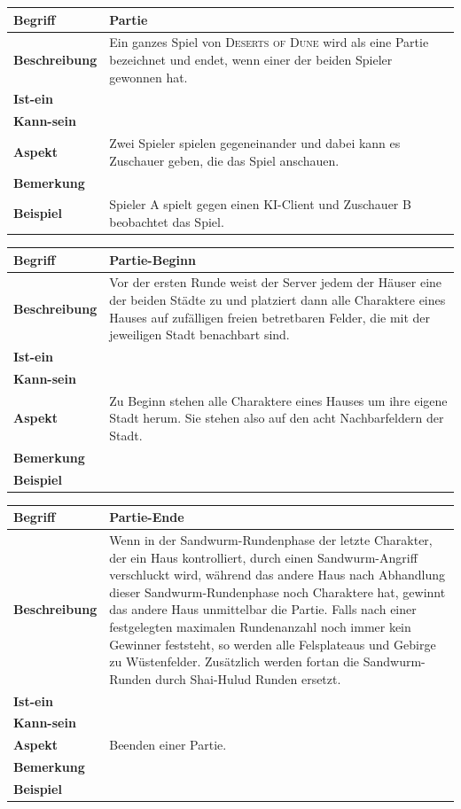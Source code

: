 \documentclass[12pt]{article}
\begin{document}
\begin{tabularx}{\linewidth}{|l|X|}
\hline
\textbf{Begriff} & \textbf{Partie} \\
\hline
\textbf{Beschreibung} & Ein ganzes Spiel von \textsc{Deserts of Dune} wird als eine Partie bezeichnet und endet, wenn einer der beiden Spieler gewonnen hat. \\
\hline
\textbf{Ist-ein} & \\
\hline
\textbf{Kann-sein} & \\
\hline
\textbf{Aspekt} & Zwei Spieler spielen gegeneinander und dabei kann es Zuschauer geben, die das Spiel anschauen.\\
\hline
\textbf{Bemerkung} &  \\
\hline
\textbf{Beispiel} & Spieler A spielt gegen einen KI-Client und Zuschauer B beobachtet das Spiel. \\
\hline
\end{tabularx}

\begin{tabularx}{\linewidth}{|l|X|}
\hline
\textbf{Begriff} & \textbf{Partie-Beginn} \\
\hline
\textbf{Beschreibung} & Vor der ersten Runde weist der Server jedem der Häuser eine der beiden Städte zu und platziert dann alle Charaktere eines Hauses auf zufälligen freien betretbaren Felder, die mit der jeweiligen Stadt benachbart sind. \\
\hline
\textbf{Ist-ein} & \\
\hline
\textbf{Kann-sein} & \\
\hline
\textbf{Aspekt} & Zu Beginn stehen alle Charaktere eines Hauses um ihre eigene Stadt herum. Sie stehen also auf den acht Nachbarfeldern der Stadt.\\
\hline
\textbf{Bemerkung} &  \\
\hline
\textbf{Beispiel} &  \\
\hline
\end{tabularx}

\begin{tabularx}{\linewidth}{|l|X|}
\hline
\textbf{Begriff} & \textbf{Partie-Ende} \\
\hline
\textbf{Beschreibung} & Wenn in der Sandwurm-Rundenphase der letzte Charakter, der ein Haus kontrolliert, durch einen Sandwurm-Angriff verschluckt wird, während das andere Haus nach Abhandlung dieser Sandwurm-Rundenphase noch Charaktere hat, gewinnt das andere Haus unmittelbar die Partie. Falls nach einer festgelegten maximalen Rundenanzahl noch immer kein Gewinner feststeht, so werden alle Felsplateaus und Gebirge zu Wüstenfelder. Zusätzlich werden fortan die Sandwurm-Runden durch Shai-Hulud Runden ersetzt.\\
\hline
\textbf{Ist-ein} & \\
\hline
\textbf{Kann-sein} & \\
\hline
\textbf{Aspekt} & Beenden einer Partie.\\
\hline
\textbf{Bemerkung} &  \\
\hline
\textbf{Beispiel} &  \\
\hline
\end{tabularx}
\end{document}
